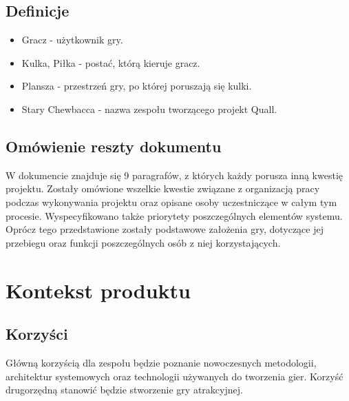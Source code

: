 \documentclass[12pt,a4paper,twoside]{article}
\begin{document}
\subsection{Definicje}
\begin{itemize}
\item Gracz - użytkownik gry.
\item Kulka, Piłka - postać, którą kieruje gracz.
\item Plansza - przestrzeń gry, po której poruszają się kulki.
\item Stary Chewbacca - nazwa zespołu tworzącego projekt Quall.
\end{itemize}



\subsection{Omówienie reszty dokumentu}
W dokumencie znajduje się 9 paragrafów, z których każdy porusza inną kwestię projektu. Zostały omówione wszelkie kwestie związane z organizacją pracy podczas wykonywania projektu oraz opisane osoby uczestniczące w całym tym procesie. Wyspecyfikowano także priorytety poszczególnych elementów systemu. Oprócz tego przedstawione zostały podstawowe założenia gry, dotyczące jej przebiegu oraz funkcji poszczególnych osób z niej korzystających.



\section{Kontekst produktu}

\subsection{Korzyści}
Główną korzyścią dla zespołu będzie poznanie nowoczesnych metodologii, architektur systemowych oraz technologii używanych do tworzenia gier. 
Korzyść drugorzędną stanowić będzie stworzenie gry atrakcyjnej. 
\end{document}
